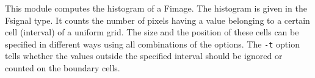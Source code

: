 This module computes the histogram of a Fimage.
The histogram is given in the Fsignal type.
It counts the number of pixels having a value belonging to a certain
cell (interval) of a uniform grid.
The size and the position of these cells can be specified in different
ways using all combinations of the options. The \verb+-t+ option tells
whether the values outside the specified interval should be ignored or
counted on the boundary cells.




